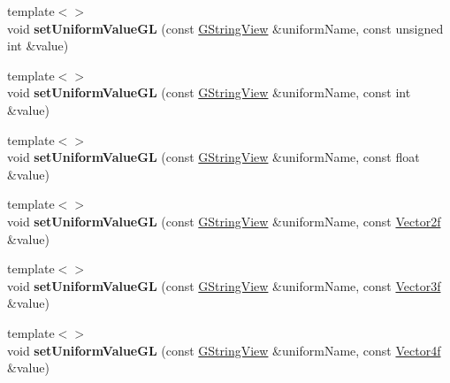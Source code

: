 \begin{Indent}
\begin{DoxyCompactItemize}
\mbox{\label{classrev_1_1_shader_program_a9ff33fd58ec6d5f195af533eda3ee82c}} 
{\footnotesize template$<$$>$ }\\void {\bfseries set\+Uniform\+Value\+GL} (const \mbox{\hyperlink{classrev_1_1_g_string_view}{G\+String\+View}} \&uniform\+Name, const unsigned int \&value)
\item 
\mbox{\label{classrev_1_1_shader_program_ac111854bfc2cb309cf311f69be411585}} 
{\footnotesize template$<$$>$ }\\void {\bfseries set\+Uniform\+Value\+GL} (const \mbox{\hyperlink{classrev_1_1_g_string_view}{G\+String\+View}} \&uniform\+Name, const int \&value)
\item 
\mbox{\label{classrev_1_1_shader_program_a936bed778bccbe7979125cba7b8651f2}} 
{\footnotesize template$<$$>$ }\\void {\bfseries set\+Uniform\+Value\+GL} (const \mbox{\hyperlink{classrev_1_1_g_string_view}{G\+String\+View}} \&uniform\+Name, const float \&value)
\item 
\mbox{\label{classrev_1_1_shader_program_a582be41b6af55bc5bf7b7fbb677ac1c5}} 
{\footnotesize template$<$$>$ }\\void {\bfseries set\+Uniform\+Value\+GL} (const \mbox{\hyperlink{classrev_1_1_g_string_view}{G\+String\+View}} \&uniform\+Name, const \mbox{\hyperlink{classrev_1_1_vector}{Vector2f}} \&value)
\item 
\mbox{\label{classrev_1_1_shader_program_a0f670b702f05b894188d04df331706ff}} 
{\footnotesize template$<$$>$ }\\void {\bfseries set\+Uniform\+Value\+GL} (const \mbox{\hyperlink{classrev_1_1_g_string_view}{G\+String\+View}} \&uniform\+Name, const \mbox{\hyperlink{classrev_1_1_vector}{Vector3f}} \&value)
\item 
\mbox{\label{classrev_1_1_shader_program_a55b73ae9e2f5b8a83256bfaa9a37b065}} 
{\footnotesize template$<$$>$ }\\void {\bfseries set\+Uniform\+Value\+GL} (const \mbox{\hyperlink{classrev_1_1_g_string_view}{G\+String\+View}} \&uniform\+Name, const \mbox{\hyperlink{classrev_1_1_vector}{Vector4f}} \&value)

\end{DoxyCompactItemize}
\end{Indent}
